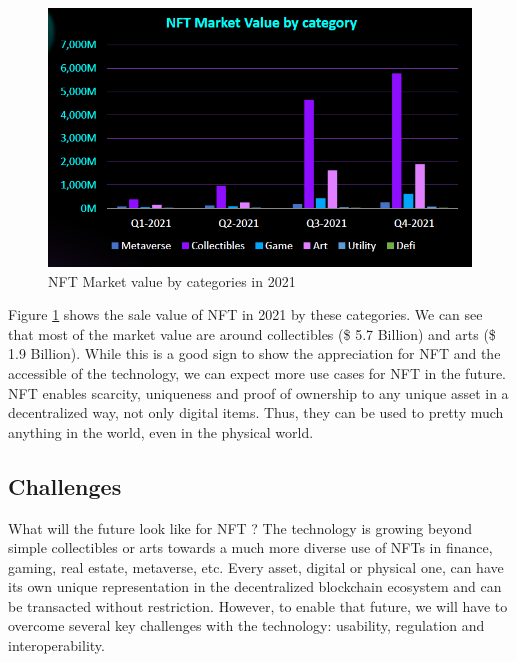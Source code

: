 \documentclass[12pt]{article}
\begin{document}
\begin{figure}[ht]
\label{fig:nftsale}
\includegraphics[width=14cm]{img/nftchart.png}
\centering
\caption{NFT Market value by categories in 2021 \cite{nftsale}}
\end{figure}

Figure \ref{fig:nftsale} shows the sale value of NFT in 2021 by these categories. We can see that most of the market value are around collectibles (\$ 5.7 Billion) and arts (\$ 1.9 Billion). While this is a good sign to show the appreciation for NFT and the accessible of the technology, we can expect more use cases for NFT in the future. NFT enables scarcity, uniqueness and proof of ownership to any unique asset in a decentralized way, not only digital items. Thus, they can be used to pretty much anything in the world, even in the physical world. 

\subsection{Challenges}
What will the future look like for NFT ? The technology is growing beyond simple collectibles or arts towards a much more diverse use of NFTs in finance, gaming, real estate, metaverse, etc. Every asset, digital or physical one, can have its own unique representation in the decentralized blockchain ecosystem and can be transacted without restriction. However, to enable that future, we will have to overcome several key challenges with the technology: usability, regulation and interoperability.
\end{document}
